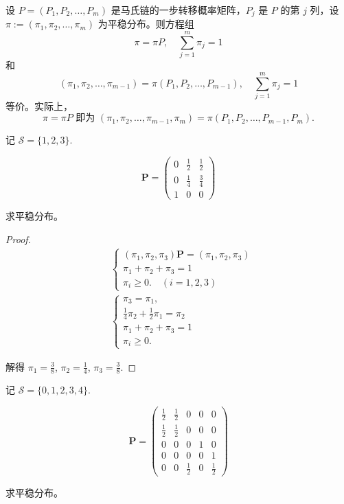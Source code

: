 \documentclass[lang=cn,10pt,thmcnt=section]{elegantbook}
\begin{document}
设 $P = (P_1, P_2, \ldots, P_m)$ 是马氏链的一步转移概率矩阵，$P_j$ 是 $P$ 的第 $j$ 列，设 $\pi := (\pi_1, \pi_2, \ldots, \pi_m)$ 为平稳分布。则方程组
\[
\pi = \pi P, \quad \sum_{j=1}^{m} \pi_j = 1 \tag{5.1}
\]
和
\[
(\pi_1, \pi_2, \ldots, \pi_{m-1}) = \pi(P_1, P_2, \ldots, P_{m-1}), \quad \sum_{j=1}^{m} \pi_j = 1 \tag{5.2}
\]
等价。实际上，
\[
\pi = \pi P \text{ 即为 } (\pi_1, \pi_2, \ldots, \pi_{m-1}, \pi_m) = \pi(P_1, P_2, \ldots, P_{m-1}, P_m).
\]


\begin{example}
	记 $\mathcal{S} = \{1, 2, 3\}$.

\[
\mathbf{P} = \begin{pmatrix}
0 & \frac{1}{2} & \frac{1}{2} \\
0 & \frac{1}{4} & \frac{3}{4} \\
1 & 0 & 0
\end{pmatrix}
\]

求平稳分布。
\end{example}
\begin{proof}
	\begin{align*}
		&\begin{cases}
		(\pi_1, \pi_2, \pi_3) \mathbf{P} = (\pi_1, \pi_2, \pi_3) \\
		\pi_1 + \pi_2 + \pi_3 = 1 \\
		\pi_i \geq 0. \quad (i = 1, 2, 3)
		\end{cases} \\
		&\begin{cases}
		\pi_3 = \pi_1, \\
		\frac{1}{4} \pi_2 + \frac{1}{2} \pi_1 = \pi_2 \\
		\pi_1 + \pi_2 + \pi_3 = 1 \\
		\pi_i \geq 0.
		\end{cases}
		\end{align*}
		
		解得 $\pi_1 = \frac{3}{8}$, $\pi_2 = \frac{1}{4}$, $\pi_3 = \frac{3}{8}$.
\end{proof}
\begin{example}
	记 $\mathcal{S} = \{0, 1, 2, 3, 4\}$.

\[
\mathbf{P} = \begin{pmatrix}
\frac{1}{2} & \frac{1}{2} & 0 & 0 & 0 \\
\frac{1}{2} & \frac{1}{2} & 0 & 0 & 0 \\
0 & 0 & 0 & 1 & 0 \\
0 & 0 & 0 & 0 & 1 \\
0 & 0 & \frac{1}{2} & 0 & \frac{1}{2}
\end{pmatrix}
\]

求平稳分布。
\end{example}
\end{document}
